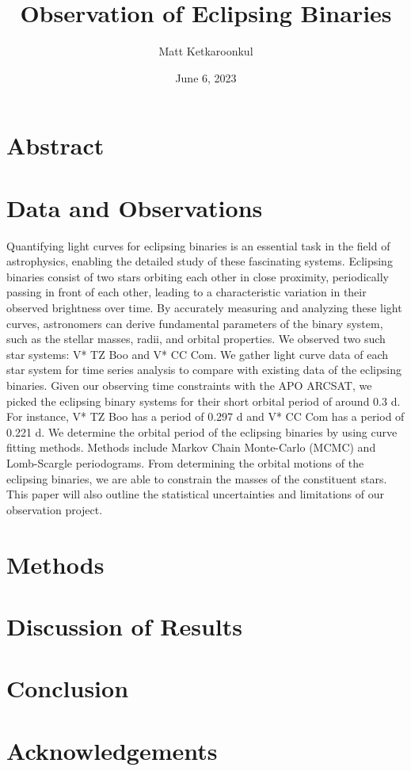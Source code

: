 \documentclass[12pt]{article}
\title{\vspace{-2em} {\bf Observation of Eclipsing Binaries}}
\author{Matt Ketkaroonkul}
\date{June 6, 2023}
\begin{document}
\maketitle

\section{Abstract}

\section{Data and Observations}
Quantifying light curves for eclipsing binaries is an essential task in the field of astrophysics, enabling the detailed study of these fascinating systems. Eclipsing binaries consist of two stars orbiting each other in close proximity, periodically passing in front of each other, leading to a characteristic variation in their observed brightness over time. By accurately measuring and analyzing these light curves, astronomers can derive fundamental parameters of the binary system, such as the stellar masses, radii, and orbital properties.
We observed two such star systems: V* TZ Boo and V* CC Com. We gather light curve data of each star system for time series analysis to compare with existing data of the eclipsing binaries. Given our observing time constraints with the APO ARCSAT, we picked the eclipsing binary systems for their short orbital period of around 0.3 d. For instance, V* TZ Boo has a period of 0.297 d and V* CC Com has a period of 0.221 d.
We determine the orbital period of the eclipsing binaries by using curve fitting methods. Methods include Markov Chain Monte-Carlo (MCMC) and Lomb-Scargle periodograms. From determining the orbital motions of the eclipsing binaries, we are able to constrain the masses of the constituent stars. This paper will also outline the statistical uncertainties and limitations of our observation project. 

\section{Methods}
\section{Discussion of Results}
\section{Conclusion}
\section{Acknowledgements}
\end{document}
